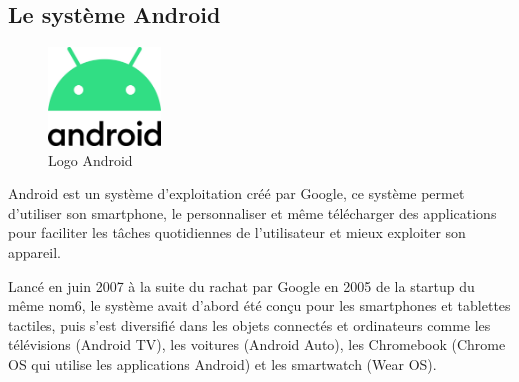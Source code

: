 \subsection{Le système Android}
\begin{figure}
    \vspace{-15pt}
    \includegraphics[width=3cm]{images/Chapitre1/android.jpg}
    \vspace{-20pt}
    \caption{{\footnotesize Logo Android}}
\end{figure}



Android est un système d'exploitation créé par Google, ce système permet d'utiliser son smartphone, le personnaliser et même télécharger des applications pour faciliter les tâches quotidiennes de l'utilisateur et mieux exploiter son appareil.

Lancé en juin 2007 à la suite du rachat par Google en 2005 de la startup du même nom6, le système avait d'abord été conçu pour les smartphones et tablettes tactiles, puis s'est diversifié dans les objets connectés et ordinateurs comme les télévisions (Android TV), les voitures (Android Auto), les Chromebook (Chrome OS qui utilise les applications Android) et les smartwatch (Wear OS).~\cite{AndroidWikipedia}

